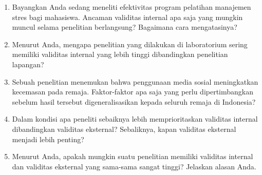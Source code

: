 \documentclass[
  indonesian,
  letterpaper,
  DIV=11,
  numbers=noendperiod]{scrreprt}
\providecommand{\tightlist}{%
  \setlength{\itemsep}{0pt}\setlength{\parskip}{0pt}}
\begin{document}
\begin{tcolorbox}[enhanced jigsaw, colframe=quarto-callout-important-color-frame, toptitle=1mm, breakable, leftrule=.75mm, arc=.35mm, toprule=.15mm, colback=white, colbacktitle=quarto-callout-important-color!10!white, bottomtitle=1mm, bottomrule=.15mm, titlerule=0mm, title=\textcolor{quarto-callout-important-color}{\faExclamation}\hspace{0.5em}{Refleksi \& Diskusi}, coltitle=black, left=2mm, opacitybacktitle=0.6, opacityback=0, rightrule=.15mm]

\begin{enumerate}
\def\labelenumi{\arabic{enumi}.}
\tightlist
\item
  Bayangkan Anda sedang meneliti efektivitas program pelatihan manajemen
  stres bagi mahasiswa. Ancaman validitas internal apa saja yang mungkin
  muncul selama penelitian berlangsung? Bagaimana cara mengatasinya?
\item
  Menurut Anda, mengapa penelitian yang dilakukan di laboratorium sering
  memiliki validitas internal yang lebih tinggi dibandingkan penelitian
  lapangan?
\item
  Sebuah penelitian menemukan bahwa penggunaan media sosial meningkatkan
  kecemasan pada remaja. Faktor-faktor apa saja yang perlu
  dipertimbangkan sebelum hasil tersebut digeneralisasikan kepada
  seluruh remaja di Indonesia?
\item
  Dalam kondisi apa peneliti sebaiknya lebih memprioritaskan validitas
  internal dibandingkan validitas eksternal? Sebaliknya, kapan validitas
  eksternal menjadi lebih penting?
\item
  Menurut Anda, apakah mungkin suatu penelitian memiliki validitas
  internal dan validitas eksternal yang sama-sama sangat tinggi?
  Jelaskan alasan Anda.
\end{enumerate}

\end{tcolorbox}
\end{document}
